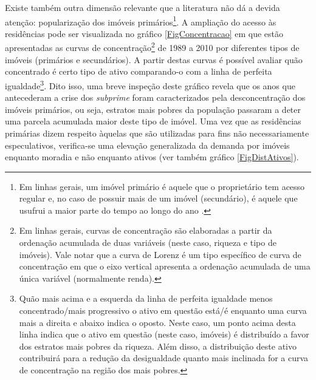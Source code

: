 Existe também outra dimensão relevante que a literatura não dá a devida atenção: popularização dos imóveis primários\footnote{
	Em linhas gerais, um imóvel primário é aquele que o proprietário tem acesso regular e, no caso de possuir mais de um imóvel (secundário), é aquele que usufrui a maior parte do tempo ao longo do ano \cite{us_census_bureau_characteristics_2017}.
}.
A ampliação do acesso às residências pode ser visualizada no gráfico \ref{FigConcentracao} em que estão apresentadas as curvas de concentração\footnote{Em linhas gerais, curvas de concentração são elaboradas a partir da ordenação acumulada de duas variáveis (neste caso, riqueza e tipo de imóveis). Vale notar que a curva de Lorenz é um tipo específico de curva de concentração em que o eixo vertical apresenta a ordenação acumulada de uma única variável (normalmente renda).} de 1989 a 2010 por diferentes tipos de imóveis (primários e secundários).
A partir destas curvas é possível avaliar quão concentrado é certo tipo de ativo comparando-o com a linha de perfeita igualdade\footnote{Quão mais acima e a esquerda da linha de perfeita igualdade menos concentrado/mais progressivo o ativo em questão está/é enquanto uma curva mais a direita e abaixo indica o oposto.
Neste caso, um ponto acima desta linha indica que o ativo em questão (neste caso, imóveis) é distribuído a favor dos estratos mais pobres da riqueza.
Além disso, a distribuição deste ativo contribuirá para a redução da desigualdade quanto mais inclinada for a curva de concentração na região dos mais pobres.
}.
Dito isso, uma breve inspeção deste gráfico revela que os anos que antecederam a crise dos \textit{subprime} foram caracterizados pela desconcentração dos imóveis primários, ou seja, estratos mais pobres da população passaram a deter uma parcela acumulada maior deste tipo de imóvel.
Uma vez que as residências primárias dizem respeito àquelas que são utilizadas para fins não necessariamente especulativos, verifica-se uma elevação generalizada da demanda por imóveis enquanto moradia e não enquanto ativos (ver também gráfico \ref{FigDistAtivos}).



